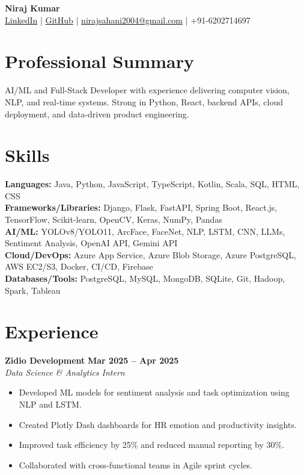 \documentclass[10pt,a4paper]{article}
\newcommand{\resumeSubheading}[4]{
  \textbf{#1} \hfill \textbf{#2}\\
  \textit{#3} \hfill \textit{#4}\\
}
\begin{document}
{\LARGE \textbf{Niraj Kumar}}\\
\href{https://www.linkedin.com/in/nirajShahni/}{LinkedIn} \;|\;
\href{https://github.com/Nirajlpu}{GitHub} \;|\;
\href{mailto:nirajsahani2004@gmail.com}{nirajsahani2004@gmail.com} \;|\;
+91-6202714697

\section*{Professional Summary}
AI/ML and Full-Stack Developer with experience delivering computer vision, NLP, and real-time systems. Strong in Python, React, backend APIs, cloud deployment, and data-driven product engineering.

\section*{Skills}
\textbf{Languages:} Java, Python, JavaScript, TypeScript, Kotlin, Scala, SQL, HTML, CSS \\
\textbf{Frameworks/Libraries:} Django, Flask, FastAPI, Spring Boot, React.js, TensorFlow, Scikit-learn, OpenCV, Keras, NumPy, Pandas \\
\textbf{AI/ML:} YOLOv8/YOLO11, ArcFace, FaceNet, NLP, LSTM, CNN, LLMs, Sentiment Analysis, OpenAI API, Gemini API \\
\textbf{Cloud/DevOps:} Azure App Service, Azure Blob Storage, Azure PostgreSQL, AWS EC2/S3, Docker, CI/CD, Firebase \\
\textbf{Databases/Tools:} PostgreSQL, MySQL, MongoDB, SQLite, Git, Hadoop, Spark, Tableau

\section*{Experience}
\resumeSubheading
  {Zidio Development}{Mar 2025 -- Apr 2025}
  {Data Science \& Analytics Intern}{}
\begin{itemize}
  \item Developed ML models for sentiment analysis and task optimization using NLP and LSTM.
  \item Created Plotly Dash dashboards for HR emotion and productivity insights.
  \item Improved task efficiency by 25\% and reduced manual reporting by 30\%.
  \item Collaborated with cross-functional teams in Agile sprint cycles.
\end{itemize}
\end{document}
